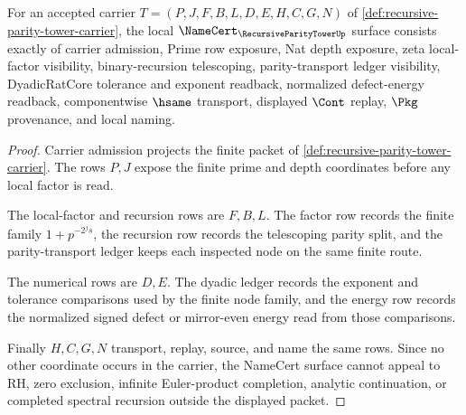 \begin{theorem}
\label{thm:recursive-parity-tower-namecert-obligations}
For an accepted carrier $T=(P,J,F,B,L,D,E,H,C,G,N)$ of \autoref{def:recursive-parity-tower-carrier}, the local $\NameCert_{\RecursiveParityTowerUp}$ surface consists exactly of carrier admission, Prime row exposure, Nat depth exposure, zeta local-factor visibility, binary-recursion telescoping, parity-transport ledger visibility, DyadicRatCore tolerance and exponent readback, normalized defect-energy readback, componentwise $\hsame$ transport, displayed $\Cont$ replay, $\Pkg$ provenance, and local naming.
\end{theorem}
\begin{proof}
Carrier admission projects the finite packet of \autoref{def:recursive-parity-tower-carrier}. The rows $P,J$ expose the finite prime and depth coordinates before any local factor is read.

The local-factor and recursion rows are $F,B,L$. The factor row records the finite family $1+p^{-2^j s}$, the recursion row records the telescoping parity split, and the parity-transport ledger keeps each inspected node on the same finite route.

The numerical rows are $D,E$. The dyadic ledger records the exponent and tolerance comparisons used by the finite node family, and the energy row records the normalized signed defect or mirror-even energy read from those comparisons.

Finally $H,C,G,N$ transport, replay, source, and name the same rows. Since no other coordinate occurs in the carrier, the NameCert surface cannot appeal to RH, zero exclusion, infinite Euler-product completion, analytic continuation, or completed spectral recursion outside the displayed packet.
\end{proof}

